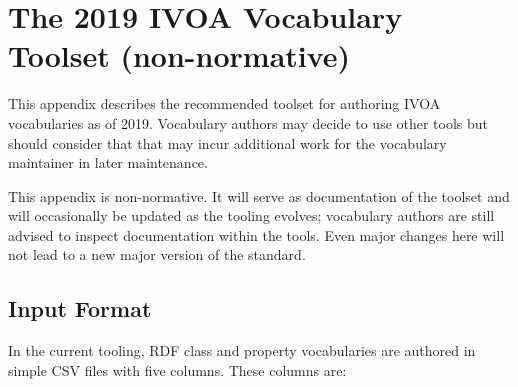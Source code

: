 \documentclass[11pt,a4paper]{ivoa}
\begin{document}
\appendix
\section{The 2019 IVOA Vocabulary Toolset (non-normative)}
\label{app:tools}

This appendix describes the recommended toolset for authoring IVOA
vocabularies as of 2019.  Vocabulary authors may decide to use other
tools but should consider that that may incur additional work for the
vocabulary maintainer in later maintenance.

This appendix is non-normative.  It will serve as documentation of the
toolset and will occasionally be updated as the tooling evolves;
vocabulary authors are still advised to inspect documentation within the
tools.  Even major changes here will not lead to a new major version of
the standard.


\subsection{Input Format}

In the current tooling, RDF class and property 
vocabularies are authored in simple CSV files
with five columns.  These columns are:
\end{document}
